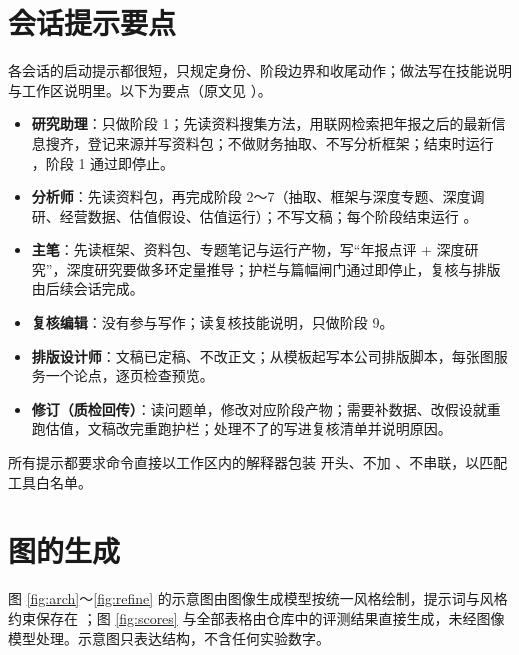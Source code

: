 \section{会话提示要点}
\label{app:prompts}

各会话的启动提示都很短，只规定身份、阶段边界和收尾动作；做法写在技能说明与工作区说明里。以下为要点（原文见 ）。

\begin{itemize}
  \item \textbf{研究助理}：只做阶段 1；先读资料搜集方法，用联网检索把年报之后的最新信息搜齐，登记来源并写资料包；不做财务抽取、不写分析框架；结束时运行 ，阶段 1 通过即停止。
  \item \textbf{分析师}：先读资料包，再完成阶段 2～7（抽取、框架与深度专题、深度调研、经营数据、估值假设、估值运行）；不写文稿；每个阶段结束运行 。
  \item \textbf{主笔}：先读框架、资料包、专题笔记与运行产物，写“年报点评 + 深度研究”，深度研究要做多环定量推导；护栏与篇幅闸门通过即停止，复核与排版由后续会话完成。
  \item \textbf{复核编辑}：没有参与写作；读复核技能说明，只做阶段 9。
  \item \textbf{排版设计师}：文稿已定稿、不改正文；从模板起写本公司排版脚本，每张图服务一个论点，逐页检查预览。
  \item \textbf{修订（质检回传）}：读问题单，修改对应阶段产物；需要补数据、改假设就重跑估值，文稿改完重跑护栏；处理不了的写进复核清单并说明原因。
\end{itemize}
所有提示都要求命令直接以工作区内的解释器包装  开头、不加 、不串联，以匹配工具白名单。

\section{图的生成}
\label{app:figs}

图 \ref{fig:arch}～\ref{fig:refine} 的示意图由图像生成模型按统一风格绘制，提示词与风格约束保存在 ；图 \ref{fig:scores} 与全部表格由仓库中的评测结果直接生成，未经图像模型处理。示意图只表达结构，不含任何实验数字。
